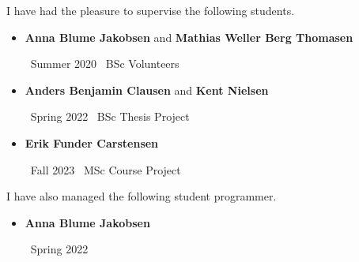 
I have had the pleasure to supervise the following students.

\medskip

\begin{itemize}

\item {\color{accent} \textbf{Anna Blume Jakobsen} and \textbf{Mathias Weller Berg Thomasen}}

  \smallskip

  \faCalendar\ Summer 2020 \hspace{82pt} \faGraduationCap\ BSc Volunteers

%

  \medskip

\item {\color{accent} \textbf{Anders Benjamin Clausen} and \textbf{Kent Nielsen}}

  \smallskip

  \faCalendar\ Spring 2022 \hspace{90pt} \faGraduationCap\ BSc Thesis Project

%

  \medskip

\item {\color{accent} \textbf{Erik Funder Carstensen}}

  \smallskip

  \faCalendar\ Fall 2023 \hspace{101pt} \faGraduationCap\ MSc Course Project

%
\end{itemize}

\smallskip

I have also managed the following student programmer.

\medskip

\begin{itemize}
\item {\color{accent} \textbf{Anna Blume Jakobsen}}

  \smallskip

  \faCalendar \ Spring 2022
\end{itemize}
